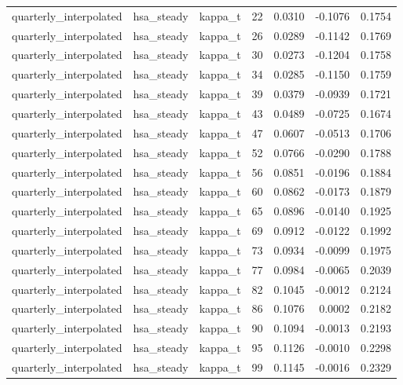 \begin{tabular}{lllrrrr}
quarterly\_interpolated & hsa\_steady & kappa\_t & 22 & 0.0310 & -0.1076 & 0.1754 \\
quarterly\_interpolated & hsa\_steady & kappa\_t & 26 & 0.0289 & -0.1142 & 0.1769 \\
quarterly\_interpolated & hsa\_steady & kappa\_t & 30 & 0.0273 & -0.1204 & 0.1758 \\
quarterly\_interpolated & hsa\_steady & kappa\_t & 34 & 0.0285 & -0.1150 & 0.1759 \\
quarterly\_interpolated & hsa\_steady & kappa\_t & 39 & 0.0379 & -0.0939 & 0.1721 \\
quarterly\_interpolated & hsa\_steady & kappa\_t & 43 & 0.0489 & -0.0725 & 0.1674 \\
quarterly\_interpolated & hsa\_steady & kappa\_t & 47 & 0.0607 & -0.0513 & 0.1706 \\
quarterly\_interpolated & hsa\_steady & kappa\_t & 52 & 0.0766 & -0.0290 & 0.1788 \\
quarterly\_interpolated & hsa\_steady & kappa\_t & 56 & 0.0851 & -0.0196 & 0.1884 \\
quarterly\_interpolated & hsa\_steady & kappa\_t & 60 & 0.0862 & -0.0173 & 0.1879 \\
quarterly\_interpolated & hsa\_steady & kappa\_t & 65 & 0.0896 & -0.0140 & 0.1925 \\
quarterly\_interpolated & hsa\_steady & kappa\_t & 69 & 0.0912 & -0.0122 & 0.1992 \\
quarterly\_interpolated & hsa\_steady & kappa\_t & 73 & 0.0934 & -0.0099 & 0.1975 \\
quarterly\_interpolated & hsa\_steady & kappa\_t & 77 & 0.0984 & -0.0065 & 0.2039 \\
quarterly\_interpolated & hsa\_steady & kappa\_t & 82 & 0.1045 & -0.0012 & 0.2124 \\
quarterly\_interpolated & hsa\_steady & kappa\_t & 86 & 0.1076 & 0.0002 & 0.2182 \\
quarterly\_interpolated & hsa\_steady & kappa\_t & 90 & 0.1094 & -0.0013 & 0.2193 \\
quarterly\_interpolated & hsa\_steady & kappa\_t & 95 & 0.1126 & -0.0010 & 0.2298 \\
quarterly\_interpolated & hsa\_steady & kappa\_t & 99 & 0.1145 & -0.0016 & 0.2329 \\
\bottomrule
\end{tabular}
